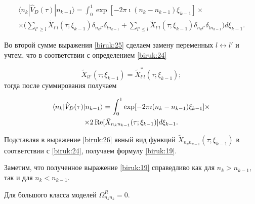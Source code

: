 \begin{multline}

\label{biruk:25}

\langle n_k |\hat{V}_D(\tau)|n_{k-1}\rangle=\int _{0}^{1}

\exp[-2\pi \imath (n_k-n_{k-1})\xi_{k-1}]

\times

\\

\times

\biggl(\sum\limits_{l'\geq l}\tilde{X}_{l' l}(\tau;\xi_{k-1})\delta_{n_k l'}\delta_{l n_{k-1}}

+

\sum\limits_{l'\leq l}\tilde{X}_{l' l}(\tau;\xi_{k-1})\delta_{n_k l'}\delta_{l n_{k-1}}\biggr)d\xi_{k-1}. 

\end{multline}



Во второй сумме выражения \eqref{biruk:25} сделаем замену переменных $l \leftrightarrow l'$ и учтем, что в соответствии с определением \eqref{biruk:24} 

$$

\tilde{X}_{ll'}(\tau;\xi_{k-1})=\tilde{X}_{l'l}^*(\tau;\xi_{k-1});

$$ тогда после суммирования получаем

\begin{multline}

\label{biruk:26}

\langle n_k |\hat{V}_D(\tau)|n_{k-1}\rangle=\int _{0}^{1}\exp[-2\pi \imath (n_k-n_{k-1})\xi_{k-1}]

\times 

\\ 

\times

2\mathop{\rm Re}[\tilde{X}_{n_k n_{k-1}}(\tau;\xi_{k-1})]d\xi_{k-1}. 

\end{multline}



Подставляя в выражение \eqref{biruk:26} явный вид функций $\tilde{X}_{n_k n_{k-1}}(\tau;\xi_{k-1})$ в соответствии с \eqref{biruk:24}, получаем формулу \eqref{biruk:19}. 

Заметим, что полученное выражение \eqref{biruk:19} справедливо как для $n_k > n_{k-1}$, так и для $n_k < n_{k-1}$. 

Для большого класса моделей $\Omega_{n_k n_k}^R=0$.



